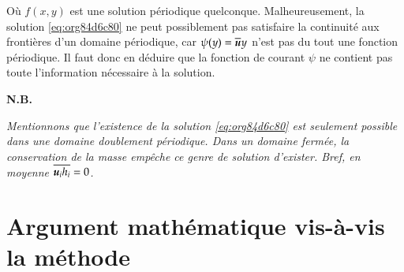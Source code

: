 \documentclass[10pt]{article}
\numberwithin{equation}{section}
\newcommand{\uu}{\vb*{u}}
\begin{document}
Où \(f(x,y)\) est une solution périodique quelconque. 
Malheureusement, la solution \ref{eq:org84d6c80} ne peut possiblement pas satisfaire la continuité aux frontières d'un domaine périodique, car \(\psi(y) = \overline{\uu} y\) n'est pas du tout une fonction périodique.
Il faut donc en déduire que la fonction de courant \(\psi\) ne contient pas toute l'information nécessaire à la solution.\bigskip

\textbf{N.B.\ } \begin{minipage}[t]{0.94\linewidth}
   \itshape Mentionnons que l'existence de la solution \ref{eq:org84d6c80} est seulement possible dans une domaine doublement périodique.
   Dans un domaine fermée, la conservation de la masse empêche ce genre de solution d'exister. Bref, en moyenne \(\overline{\uu_i h_i} = 0\).
\end{minipage}


\section{Argument mathématique vis-à-vis la méthode}
\label{sec:org6d1a3e6}
\end{document}
